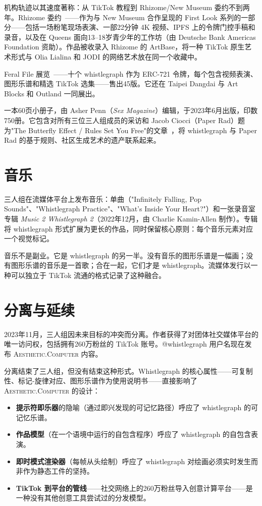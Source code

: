 \documentclass[10pt,letterpaper,twocolumn]{article}
\newcommand{\ac}{\textsc{Aesthetic.Computer}}
\begin{document}
机构轨迹以其速度著称：从 TikTok 教程到 Rhizome/New Museum 委约不到两年。Rhizome 委约~\citep{rhizome2022longest}——作为与 New Museum 合作呈现的 First Look 系列的一部分——包括一场粉笔现场表演、一部22分钟 4K 视频、IPFS 上的令牌门控手稿和录音，以及在 Queens 面向13--18岁青少年的工作坊（由 Deutsche Bank Americas Foundation 资助）。作品被收录入 Rhizome 的 ArtBase，将一种 TikTok 原生艺术形式与 Olia Lialina 和 JODI 的网络艺术放在同一个收藏中。

Feral File 展览~\citep{feralfile2022ten}——十个 whistlegraph 作为 ERC-721 令牌，每个包含视频表演、图形乐谱和精选 TikTok 选集——售出45版。它还在 Taipei Dangdai 与 Art Blocks 和 Outland 一同展出。

一本60页小册子，由 Asher Penn（\emph{Sex Magazine}）编辑，于2023年6月出版，印数750册。它包含对所有三位三人组成员的采访和 Jacob Ciocci（Paper Rad）题为"The Butterfly Effect / Rules Set You Free"的文章~\citep{ciocci2023butterfly}，将 whistlegraph 与 Paper Rad 的基于规则、社区生成艺术的遗产联系起来。

\section{音乐}

三人组在流媒体平台上发布音乐：单曲（"Infinitely Falling, Pop Sounds"、"Whistlegraph Practice"、"What's Inside Your Heart?"）和一张录音室专辑 \emph{Music 2 Whistlegraph 2}（2022年12月，由 Charlie Kamin-Allen 制作）。专辑将 whistlegraph 形式扩展为更长的作品，同时保留核心原则：每个音乐元素对应一个视觉标记。

音乐不是副业。它是 whistlegraph 的另一半。没有音乐的图形乐谱是一幅画；没有图形乐谱的音乐是一首歌；合在一起，它们才是 whistlegraph。流媒体发行以一种可以独立于 TikTok 流通的格式记录了这种融合。

\section{分离与延续}

2023年11月，三人组因未来目标的冲突而分离。作者获得了对团体社交媒体平台的唯一访问权，包括拥有260万粉丝的 TikTok 账号。@whistlegraph 用户名现在发布 \ac{} 内容。

分离结束了三人组，但没有结束这种形式。Whistlegraph 的核心属性——可复制性、标记-旋律对应、图形乐谱作为使用说明书——直接影响了 \ac{} 的设计：

\begin{itemize}
  \item \textbf{提示符即乐器}的隐喻（通过即兴发现的可记忆路径）呼应了 whistlegraph 的可记忆乐谱。
  \item \textbf{作品模型}（在一个语境中运行的自包含程序）呼应了 whistlegraph 的自包含表演。
  \item \textbf{即时模式渲染器}（每帧从头绘制）呼应了 whistlegraph 对绘画必须实时发生而非作为静态工件的坚持。
  \item \textbf{TikTok 到平台的管线}——社交网络上的260万粉丝导入创意计算平台——是一种没有其他创意工具尝试过的分发模型。
\end{itemize}
\end{document}
